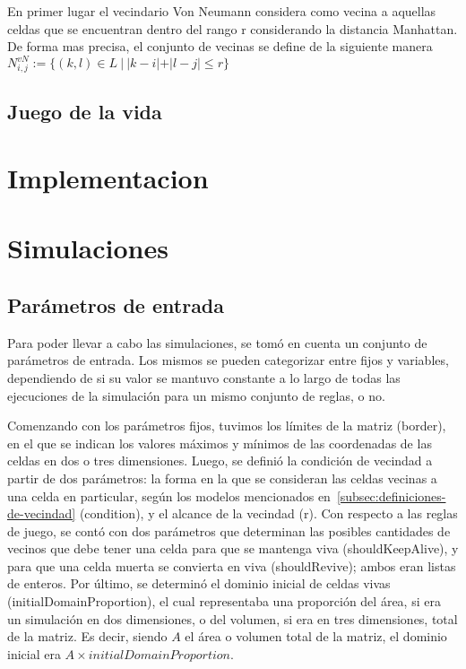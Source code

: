 \documentclass[11pt]{article}
\begin{document}
    En primer lugar el vecindario Von Neumann considera como vecina a aquellas celdas que se encuentran dentro del rango r
    considerando la distancia Manhattan. De forma mas precisa, el conjunto de vecinas se define de la siguiente manera
    $N_{i,j}^{vN}:=\{(k,l) \in L\ |\ |k-i|+ |l - j| \leq r\}$


    \subsection{Juego de la vida}\label{subsec:juego-de-la-vida}


    \section{Implementacion}\label{sec:implementacion}


    \section{Simulaciones}\label{sec:simulaciones}

    \subsection{Parámetros de entrada}\label{subsec:parametros-de-entrada}

    Para poder llevar a cabo las simulaciones, se tomó en cuenta un conjunto de parámetros de entrada.
    Los mismos se pueden categorizar entre fijos y variables, dependiendo de si su valor se mantuvo
    constante a lo largo de todas las ejecuciones de la simulación para un mismo conjunto de reglas, o no.

    Comenzando con los parámetros fijos, tuvimos los límites de la matriz (border),
    en el que se indican los valores máximos y mínimos de las coordenadas de las celdas en dos o tres dimensiones.
    Luego, se definió la condición de vecindad a partir de dos parámetros:
    la forma en la que se consideran las celdas vecinas a una celda en particular, según los modelos mencionados
    en~\ref{subsec:definiciones-de-vecindad} (condition), y el alcance de la vecindad (r).
    Con respecto a las reglas de juego, se contó con dos parámetros que determinan las posibles cantidades de
    vecinos que debe tener una celda para que se mantenga viva (shouldKeepAlive),
    y para que una celda muerta se convierta en viva (shouldRevive); ambos eran listas de enteros.
    Por último, se determinó el dominio inicial de celdas vivas (initialDomainProportion), el
    cual representaba una proporción del área, si era un simulación en dos dimensiones, o del volumen,
    si era en tres dimensiones, total de la matriz.
    Es decir, siendo $A$ el área o volumen total de la matriz, el dominio inicial era $A \times initialDomainProportion$.
\end{document}
